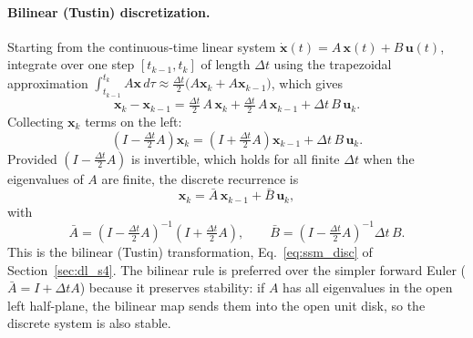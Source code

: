 \paragraph{Bilinear (Tustin) discretization.}
Starting from the continuous-time linear system
$\dot{\mathbf{x}}(t) = A\,\mathbf{x}(t) + B\,\mathbf{u}(t)$,
integrate over one step $[t_{k-1}, t_k]$ of length $\Delta t$ using the
trapezoidal approximation
$\int_{t_{k-1}}^{t_k} A\mathbf{x}\,d\tau
 \approx \tfrac{\Delta t}{2}\bigl(A\mathbf{x}_k + A\mathbf{x}_{k-1}\bigr)$,
which gives
\begin{equation}
  \mathbf{x}_k - \mathbf{x}_{k-1}
    = \tfrac{\Delta t}{2}\,A\,\mathbf{x}_k
    + \tfrac{\Delta t}{2}\,A\,\mathbf{x}_{k-1}
    + \Delta t\,B\,\mathbf{u}_k.
\end{equation}
Collecting $\mathbf{x}_k$ terms on the left:
\begin{equation}
  \left(I - \tfrac{\Delta t}{2}A\right)\mathbf{x}_k
    = \left(I + \tfrac{\Delta t}{2}A\right)\mathbf{x}_{k-1}
    + \Delta t\,B\,\mathbf{u}_k.
\end{equation}
Provided $(I - \tfrac{\Delta t}{2}A)$ is invertible, which holds for all
finite $\Delta t$ when the eigenvalues of $A$ are finite, the discrete
recurrence is
\begin{equation}\label{eq:bilinear_disc}
  \mathbf{x}_k = \bar{A}\,\mathbf{x}_{k-1} + \bar{B}\,\mathbf{u}_k,
\end{equation}
with
\begin{equation}\label{eq:bilinear_AB}
  \bar{A} = \left(I - \tfrac{\Delta t}{2}A\right)^{-1}
            \left(I + \tfrac{\Delta t}{2}A\right),
  \qquad
  \bar{B} = \left(I - \tfrac{\Delta t}{2}A\right)^{-1} \Delta t\,B.
\end{equation}
This is the bilinear (Tustin) transformation, Eq.~\eqref{eq:ssm_disc} of
Section~\ref{sec:dl_s4}.  The bilinear rule is preferred over the simpler
forward Euler ($\bar{A} = I + \Delta t A$) because it preserves stability:
if $A$ has all eigenvalues in the open left half-plane, the bilinear map
sends them into the open unit disk, so the discrete system is also stable.

